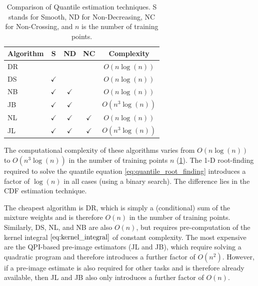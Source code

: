 \documentclass[twoside]{article} \usepackage{aistats2017}
\theoremstyle{definition}
\theoremstyle{theorem}
\newcommand{\qpi}{QPI}
\begin{document}
	\begin{table}[t!]
% 
% 
		\begin{center}
			\begin{tabular}{l|cccc}
				Algorithm & S & ND &   NC & Complexity \\ \hline
				DR  &              &                &                & $O(n \log(n))$    \\
				DS  & $\checkmark$ &                &                &
				$O(n \log(n))$  \\
				NB  & $\checkmark$ & $\checkmark$   &                &
				$O(n \log(n))$ \\
				JB  & $\checkmark$ & $\checkmark$   &                &
				$O(n^{3} \log(n))$ \\
				NL  & $\checkmark$ & $\checkmark$   & $\checkmark$   &
				$O(n \log(n))$ \\
				JL  & $\checkmark$ & $\checkmark$   & $\checkmark$   &   $O(n^{3} \log(n))$ 
			\end{tabular}
		\end{center}
		\caption{\small Comparison of Quantile estimation techniques. S stands for Smooth, ND for Non-Decreasing, NC for Non-Crossing, and $n$ is the number of training points.}
		\label{table:quantile_regression_methods}
	\end{table}
	
		
	The computational complexity of these algorithms varies from $O(n \log(n))$ to $O(n^{3} \log(n))$ in the number of training points $n$ (\cref{table:quantile_regression_methods}). The 1-D root-finding required to solve the quantile equation \eqref{eq:quantile_root_finding} introduces a factor of $\log(n)$ in all cases (using a binary search). The difference lies in the CDF estimation technique. %
	
	The cheapest algorithm is DR, which is simply a (conditional) sum of the mixture weights and is therefore $O(n)$ in the number of training points. Similarly, DS, NL, and NB are also $O(n)$, but requires pre-computation of the kernel integral $\eqref{eq:kernel_integral}$ of constant complexity. The most expensive are the \qpi-based pre-image estimators (JL and JB), which require solving a quadratic program and therefore introduces a further factor of $O(n^2)$. However, if a pre-image estimate is also required for other tasks and is therefore already available, then JL and JB also only introduces a further factor of $O(n)$.
	
\end{document}
